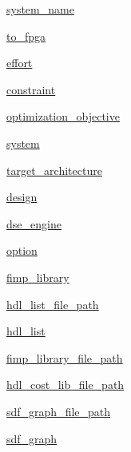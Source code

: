 \begin{DoxyCompactItemize}
\hyperlink{classsylva_1_1misc_1_1exec_1_1_s_y_l_v_a_a0c4ba48ff5f0522523f5c09cd76741c6}{system\+\_\+name}
\item 
\hyperlink{classsylva_1_1misc_1_1exec_1_1_s_y_l_v_a_af22003ff472d2eefe8f94bdea7c1284b}{to\+\_\+fpga}
\item 
\hyperlink{classsylva_1_1misc_1_1exec_1_1_s_y_l_v_a_a09adc0438520dd7b1dfdfe23c7ef1a3f}{effort}
\item 
\hyperlink{classsylva_1_1misc_1_1exec_1_1_s_y_l_v_a_adb572d8fd16282e0ccdb3c5a918c8215}{constraint}
\item 
\hyperlink{classsylva_1_1misc_1_1exec_1_1_s_y_l_v_a_aeec8f0830844725fd4c4f10cf93571c0}{optimization\+\_\+objective}
\item 
\hyperlink{classsylva_1_1misc_1_1exec_1_1_s_y_l_v_a_a9884d8e279b8c0a9913f3ecd8250aae3}{system}
\item 
\hyperlink{classsylva_1_1misc_1_1exec_1_1_s_y_l_v_a_a899dbe8ca1c8f8004ba92f48559fc3ae}{target\+\_\+architecture}
\item 
\hyperlink{classsylva_1_1misc_1_1exec_1_1_s_y_l_v_a_a0e93fa247aad3cacd2cf9163a06424d7}{design}
\item 
\hyperlink{classsylva_1_1misc_1_1exec_1_1_s_y_l_v_a_ac88cb1a25265462e3a779e86d0d00cfe}{dse\+\_\+engine}
\item 
\hyperlink{classsylva_1_1misc_1_1exec_1_1_s_y_l_v_a_a00647fa8382ef5858caef2dae557e09b}{option}
\item 
\hyperlink{classsylva_1_1misc_1_1exec_1_1_s_y_l_v_a_a67ba7dbe79e4f6efb70d61dd57635eb0}{fimp\+\_\+library}
\item 
\hyperlink{classsylva_1_1misc_1_1exec_1_1_s_y_l_v_a_a40d6bc1ec35cf7f613dcf6044367a9fa}{hdl\+\_\+list\+\_\+file\+\_\+path}
\item 
\hyperlink{classsylva_1_1misc_1_1exec_1_1_s_y_l_v_a_af72e0e1822f9ef68ce0480d095c1f86d}{hdl\+\_\+list}
\item 
\hyperlink{classsylva_1_1misc_1_1exec_1_1_s_y_l_v_a_ac488a82380bc12c37e9fdecb0691e2aa}{fimp\+\_\+library\+\_\+file\+\_\+path}
\item 
\hyperlink{classsylva_1_1misc_1_1exec_1_1_s_y_l_v_a_a8136af91b157e3b7c86e024513c51fa6}{hdl\+\_\+cost\+\_\+lib\+\_\+file\+\_\+path}
\item 
\hyperlink{classsylva_1_1misc_1_1exec_1_1_s_y_l_v_a_adc00850c41597cee31ee2738a365d1ca}{sdf\+\_\+graph\+\_\+file\+\_\+path}
\item 
\hyperlink{classsylva_1_1misc_1_1exec_1_1_s_y_l_v_a_a50b5e891a42306c00730a92dfde22bdb}{sdf\+\_\+graph}
\end{DoxyCompactItemize}
